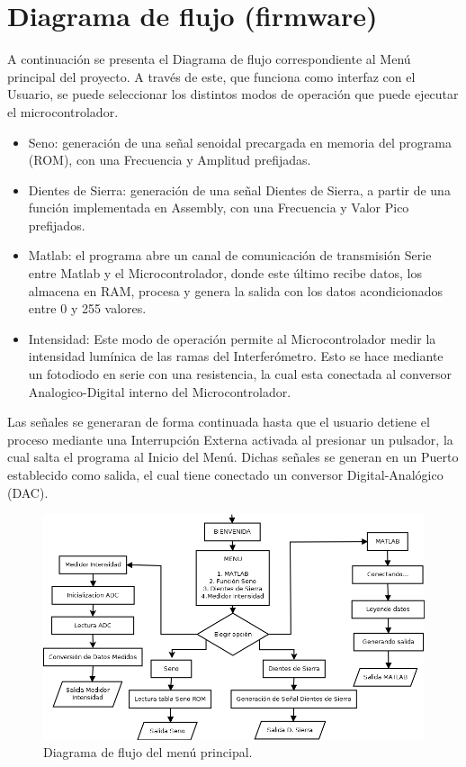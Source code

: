 \section{Diagrama de flujo (firmware)}
\label{sec:diag_flujo}
A continuación se presenta el Diagrama de flujo correspondiente al Menú principal del proyecto. A través de este, que funciona como interfaz con el Usuario, se puede seleccionar los distintos modos de operación que puede ejecutar el microcontrolador.

\begin{itemize}
\item Seno: generación de una señal senoidal precargada en memoria del programa (ROM), con una Frecuencia y Amplitud prefijadas.
\item Dientes de Sierra: generación de una señal Dientes de Sierra, a partir de una función implementada en Assembly, con una Frecuencia y Valor Pico prefijados.
\item Matlab: el programa abre un canal de comunicación de transmisión Serie entre Matlab y el Microcontrolador, donde este último recibe datos, los almacena en RAM, procesa y genera la salida con los datos acondicionados entre 0 y 255 valores.
\item Intensidad: Este modo de operación permite al Microcontrolador medir la intensidad lumínica de las ramas del Interferómetro. Esto se hace mediante un fotodiodo en serie con una resistencia, la cual esta conectada al conversor Analogico-Digital interno del Microcontrolador. 
\end{itemize}

Las señales se generaran de forma continuada hasta que el usuario detiene el proceso mediante una Interrupción Externa activada al presionar un pulsador, la cual salta el programa al Inicio del Menú.
Dichas señales se generan en un Puerto establecido como salida, el cual tiene conectado un conversor Digital-Analógico (DAC).

\begin{figure}[H]
  \centering
  \includegraphics[width=1.0\textwidth]{images/flujo_menu_informe_v1.png}
  \caption{Diagrama de flujo del menú principal.}
  \label{fig:Diagrama de flujo}
\end{figure}